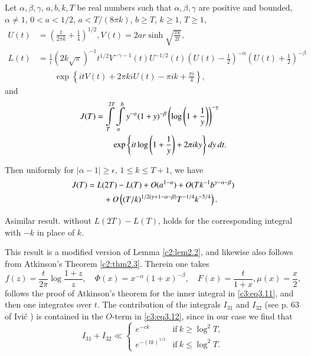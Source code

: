 \begin{lemma}\label{c3:lem3.1}
  Let $\alpha, \beta, \gamma$, $a, b, k, T$ be real numbers such that
  $\alpha, \beta, \gamma$ are positive and bounded, $\alpha \neq 1$,
  $0 < a < 1/2$, $a < T/(8 \pi k)$, $b \geq T$, $k \geq 1$, $T \geq
  1$, 
  \begin{align*}
    U(t) & = \left( \frac{t}{2 \pi k} + \frac{1}{4}\right)^{1/2}, V(t)
    = 2 ar \sinh \sqrt{\frac{\pi k}{2t}},\\
    L(t) & = \frac{1}{i} (2 k\sqrt{\pi})^{-1} t^{1/2} V^{- \gamma-1}
    (t) U^{-1/2} (t) \left(U(t) - \frac{1}{2}\right)^{-\alpha}
    \left( U (t) + \frac{1}{2}\right)^{-\beta}\\ 
    &\qquad\exp \left\{it V (t)
    + 2 \pi k iU (t) - \pi i k + \frac{\pi i}{4}\right\},
  \end{align*}
  and 
  \begin{align}
    J(T) &= \int\limits_T^{2T} \int\limits_a^b y^{- \alpha} (1+
    y)^{-\beta}  \left(\log \left(1+ \frac{1}{y}
    \right)\right)^{-\gamma}\notag\\ 
    &\qquad \exp \left\{ it \log \left(1+ \frac{1}{y}\right)
    + 2 \pi i ky\right\} dy\, dt.\label{c3:eq3.11}
  \end{align}
\end{lemma}

Then uniformly for $|\alpha -1|\geq \epsilon$, $1 \leq k \leq T + 1$,
we have
\begin{align}
  J(T) &= L(2T) - L(T) + O(a^{1-\alpha})  + O(Tk^{-1} b^{\gamma - \alpha
    - \beta})\notag\\
  &\qquad + O \left(( T/k)^{1/2 (\gamma +1 - \alpha - \beta)}T^{-1/4}
  k^{-5/4}\right). \label{c3:eq3.12}
\end{align}

A\pageoriginale similar result. without $L(2T)- L(T)$, holds for the
corresponding integral with $-k$ in place of $k$.

This result is a modified version of Lemma \ref{c2:lem2.2}, and
likewise also follows from Atkinson's Theorem \ref{c2:thm2.3}. Therein
one takes
$$
f(z) = \frac{t}{2 \pi} \log \frac{1 + z}{z},\quad \Phi (x) = x^{-\alpha}
(1+ x)^{-\beta},\quad F(x) = \frac{t}{1+x}, \mu(x) = \frac{x}{2},
$$
follows the proof of Atkinson's theorem for the inner integral in
\eqref{c3:eq3.11}, and then one integrates over $t$. The contribution
of the integrals $I_{31}$ and $I_{32}$ (see p. 63 of Ivi\'c \cite{Ivic1})
is contained in the $O$-term in \eqref{c3:eq3.12}, since in our case
we find that
$$
I_{31} + I_{32} \ll 
\begin{cases}
  e^{-ck} & \text{if}~ k \geq \log^2 T,\\
  e^{- (tk)^{1/2}} & \text{if}~ k \leq \log^2 T.
\end{cases}
$$ 

